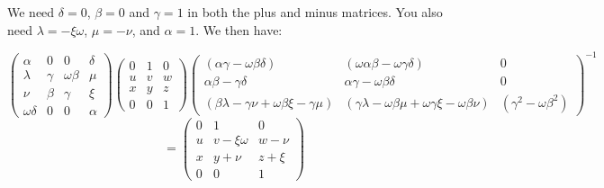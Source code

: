 \documentclass[10pt]{article}
\begin{document}
We need $\delta =0$, $\beta =0$ and $\gamma =1$ in both the plus and minus
matrices. You also need $\lambda =-\xi \omega $, $\mu =-\nu $, and $\alpha
=1 $. We then have:

\[
\left( 
\begin{array}{cccc}
\alpha & 0 & 0 & \delta \\ 
\lambda & \gamma & \omega \beta & \mu \\ 
\nu & \beta & \gamma & \xi \\ 
\omega \delta & 0 & 0 & \alpha%
\end{array}%
\right) \left( 
\begin{array}{ccc}
0 & 1 & 0 \\ 
u & v & w \\ 
x & y & z \\ 
0 & 0 & 1%
\end{array}%
\right) \left( 
\begin{array}{ccc}
(\alpha \gamma -\omega \beta \delta ) & (\omega \alpha \beta -\omega \gamma
\delta ) & 0 \\ 
\alpha \beta -\gamma \delta & \alpha \gamma -\omega \beta \delta & 0 \\ 
(\beta \lambda -\gamma \nu +\omega \beta \xi -\gamma \mu ) & (\gamma \lambda
-\omega \beta \mu +\omega \gamma \xi -\omega \beta \nu ) & (\gamma
^{2}-\omega \beta ^{2})%
\end{array}%
\right) ^{-1} 
\]
\[
=\left( 
\begin{array}{ccc}
0 & 1 & 0 \\ 
u & v-\xi \omega & w-\nu \\ 
x & y+\nu & z+\xi \\ 
0 & 0 & 1%
\end{array}%
\right) 
\]
\end{document}
